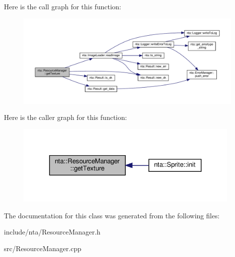 Here is the call graph for this function\+:
\nopagebreak
\begin{figure}[H]
\begin{center}
\leavevmode
\includegraphics[width=350pt]{d5/d87/classnta_1_1ResourceManager_a60911bfeef0df3802c6ef03cc10fb5c1_cgraph}
\end{center}
\end{figure}
Here is the caller graph for this function\+:
\nopagebreak
\begin{figure}[H]
\begin{center}
\leavevmode
\includegraphics[width=312pt]{d5/d87/classnta_1_1ResourceManager_a60911bfeef0df3802c6ef03cc10fb5c1_icgraph}
\end{center}
\end{figure}


The documentation for this class was generated from the following files\+:\begin{DoxyCompactItemize}
\item 
include/nta/Resource\+Manager.\+h\item 
src/Resource\+Manager.\+cpp\end{DoxyCompactItemize}
